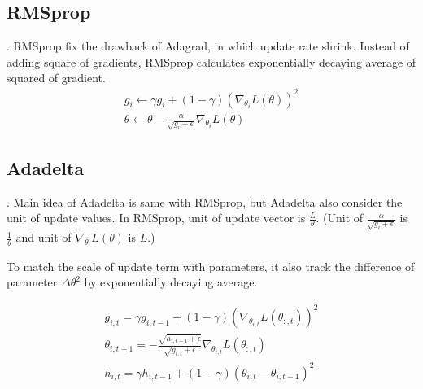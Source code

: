 \documentclass[8pt]{beamer}
\begin{document}
\subsection{RMSprop}
\begin{frame}{.}
    RMSprop fix the drawback of Adagrad, in which update rate shrink. Instead of adding square of gradients, RMSprop calculates exponentially decaying average of squared of gradient.
    \[
        \begin{gathered}
            g_i \leftarrow \gamma g_i  + (1- \gamma) (\nabla_{\theta_i} L(\theta))^2 \\
            \theta \leftarrow \theta - \frac{\alpha}{\sqrt{g_i + \epsilon}} \nabla_{\theta_i} L(\theta)
        \end{gathered}
    \]

\end{frame}

\subsection{Adadelta}
\begin{frame}{.}
    Main idea of Adadelta is same with RMSprop, but Adadelta also consider the unit of update values.
    In RMSprop, unit of update vector is $\frac{L}{\theta}$. (Unit of $\frac{\alpha}{\sqrt{g_i + \epsilon}}$ is  $\frac{1}{\theta}$ and unit of $\nabla_{\theta_i} L(\theta)$ is $L$.)

    To match the scale of update term with parameters, it also track the difference of parameter $\Delta \theta^2$ by exponentially decaying average.

    \[
    \begin{gathered}
        g_{i,t} = \gamma g_{i,t-1} + (1- \gamma) (\nabla_{\theta_{i,t}} L(\theta_{:, t}))^2 \\
        \theta_{i,t+1} = -\frac{\sqrt{h_{i,t-1} + \epsilon}}{\sqrt{g_{i, t} + \epsilon}} \nabla_{\theta_{i,t}} L(\theta_{:,t}) \\
        h_{i,t} = \gamma h_{i,t-1} + (1-\gamma) (\theta_{i,t} - \theta_{i,t-1})^2 \\
    \end{gathered}
    \]

\end{frame}
\end{document}
